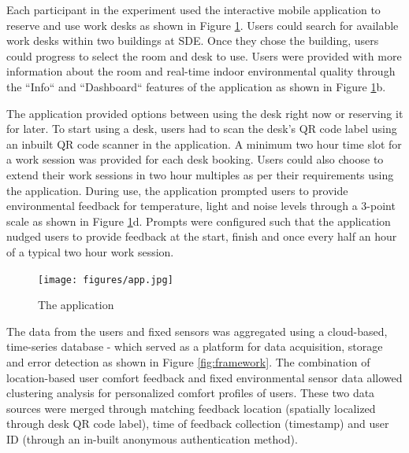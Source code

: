 \documentclass[]{interact}
\theoremstyle{plain}%
\theoremstyle{definition}
\theoremstyle{remark}
\begin{document}
Each participant in the experiment used the interactive mobile application to reserve and use work desks as shown in Figure \ref{app}. Users could search for available work desks within two buildings at SDE. Once they chose the building, users could progress to select the room and desk to use. Users were provided with more information about the room and real-time indoor environmental quality through the ``Info`` and ``Dashboard`` features of the application as shown in Figure \ref{app}b. 

The application provided options between using the desk right now or reserving it for later. To start using a desk, users had to scan the desk's QR code label using an inbuilt QR code scanner in the application. A minimum two hour time slot for a work session was provided for each desk booking. Users could also choose to extend their work sessions in two hour multiples as per their requirements using the application. During use, the application prompted users to provide environmental feedback for temperature, light and noise levels through a 3-point scale as shown in Figure \ref{app}d. Prompts were configured such that the application nudged users to provide feedback at the start, finish and once every half an hour of a typical two hour work session. 

\begin{figure}
\centering
\texttt{[image: figures/app.jpg]}
\caption{The application} 
\label{app}
\end{figure}


The data from the users and fixed sensors was aggregated using a cloud-based, time-series database - which served as a platform for data acquisition, storage and error detection as shown in Figure \ref{fig:framework}. The combination of location-based user comfort feedback and fixed environmental sensor data allowed clustering analysis for personalized comfort profiles of users. These two data sources were merged through matching feedback location (spatially localized through desk QR code label), time of feedback collection (timestamp) and user ID (through an in-built anonymous authentication method).     




\end{document}
